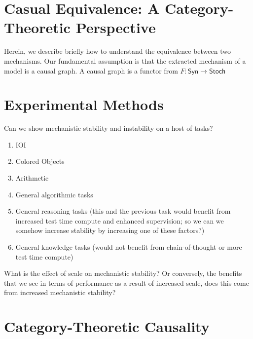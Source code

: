 \documentclass[10pt]{article}
\begin{document}
\section{Casual Equivalence: A Category-Theoretic Perspective}
Herein, we describe briefly how to understand the equivalence between two mechanisms.
Our fundamental assumption is that the extracted mechanism of a model is 
a causal graph.
A causal graph is a functor from $F: \textsf{Syn} \to \textsf{Stoch}$





\section{Experimental Methods}
Can we show mechanistic stability and instability on a host of tasks?
\begin{enumerate}
\item IOI
\item Colored Objects
\item Arithmetic
\item General algorithmic tasks
\item General reasoning tasks (this and the previous task would benefit
from increased test time compute and enhanced supervision; so we can we
somehow increase stability by increasing one of these factors?)
\item General knowledge tasks (would not benefit from chain-of-thought or more
test time compute)
\end{enumerate}
What is the effect of scale on mechanistic stability? Or conversely, the benefits
that we see in terms of performance as a result of increased scale, does this
come from increased mechanistic stability?




\newpage
\section{Category-Theoretic Causality}
\end{document}
